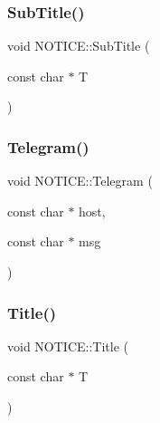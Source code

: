 \mbox{\label{namespace_n_o_t_i_c_e_a483b62c015a4211e2716f730ad2c0a44}} 
\subsubsection{\texorpdfstring{Sub\+Title()}{SubTitle()}}
{\footnotesize\ttfamily void N\+O\+T\+I\+C\+E\+::\+Sub\+Title (\begin{DoxyParamCaption}\item[{const char $\ast$}]{T }\end{DoxyParamCaption})\hspace{0.3cm}{\ttfamily [inline]}}

\mbox{\label{namespace_n_o_t_i_c_e_a7f45e7bbaeb797160d77c7c5dbbb37a6}} 
\subsubsection{\texorpdfstring{Telegram()}{Telegram()}}
{\footnotesize\ttfamily void N\+O\+T\+I\+C\+E\+::\+Telegram (\begin{DoxyParamCaption}\item[{const char $\ast$}]{host,  }\item[{const char $\ast$}]{msg }\end{DoxyParamCaption})\hspace{0.3cm}{\ttfamily [inline]}}

\mbox{\label{namespace_n_o_t_i_c_e_a0ddfb0ca7dfa968616d34f4752368bba}} 
\subsubsection{\texorpdfstring{Title()}{Title()}}
{\footnotesize\ttfamily void N\+O\+T\+I\+C\+E\+::\+Title (\begin{DoxyParamCaption}\item[{const char $\ast$}]{T }\end{DoxyParamCaption})\hspace{0.3cm}{\ttfamily [inline]}}



